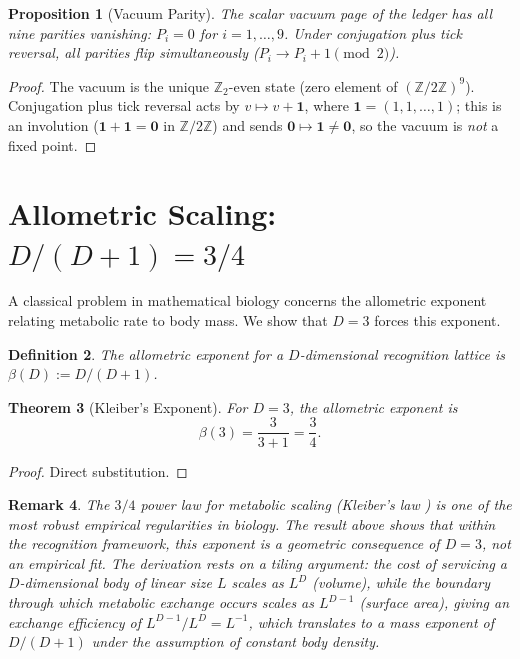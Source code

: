 \documentclass[11pt]{article}
\newtheorem{theorem}{Theorem}[section]
\newtheorem{proposition}[theorem]{Proposition}
\newtheorem{definition}[theorem]{Definition}
\newtheorem{remark}[theorem]{Remark}
\newcommand{\Z}{\mathbb{Z}}
\begin{document}
\begin{proposition}[Vacuum Parity]\label{prop:vacuum}
The scalar vacuum page of the ledger has all nine parities vanishing: $P_i = 0$ for $i = 1, \ldots, 9$.
Under conjugation plus tick reversal, all parities flip simultaneously ($P_i \to P_i + 1 \pmod{2}$).
\end{proposition}

\begin{proof}
The vacuum is the unique $\Z_2$-even state (zero element of $(\Z/2\Z)^9$).
Conjugation plus tick reversal acts by $v \mapsto v + \mathbf{1}$, where $\mathbf{1} = (1,1,\ldots,1)$; this is an involution ($\mathbf{1} + \mathbf{1} = \mathbf{0}$ in $\Z/2\Z$) and sends $\mathbf{0} \mapsto \mathbf{1} \neq \mathbf{0}$, so the vacuum is \emph{not} a fixed point.
\end{proof}

\section{Allometric Scaling: $D/(D+1) = 3/4$}
\label{sec:allometric}

A classical problem in mathematical biology concerns the allometric exponent relating metabolic rate to body mass.
We show that $D = 3$ forces this exponent.

\begin{definition}\label{def:allometric}
The \emph{allometric exponent} for a $D$-dimensional recognition lattice is $\beta(D) := D/(D+1)$.
\end{definition}

\begin{theorem}[Kleiber's Exponent]\label{thm:kleiber}
For $D = 3$, the allometric exponent is
\[
\beta(3) = \frac{3}{3+1} = \frac{3}{4}.
\]
\end{theorem}

\begin{proof}
Direct substitution.
\end{proof}

\begin{remark}
The $3/4$ power law for metabolic scaling (Kleiber's law \cite{Kleiber1932}) is one of the most robust empirical regularities in biology.
The result above shows that within the recognition framework, this exponent is a \emph{geometric consequence of $D = 3$}, not an empirical fit.
The derivation rests on a tiling argument: the cost of servicing a $D$-dimensional body of linear size $L$ scales as $L^D$ (volume), while the boundary through which metabolic exchange occurs scales as $L^{D-1}$ (surface area), giving an exchange efficiency of $L^{D-1}/L^D = L^{-1}$, which translates to a mass exponent of $D/(D+1)$ under the assumption of constant body density.
\end{remark}
\end{document}
